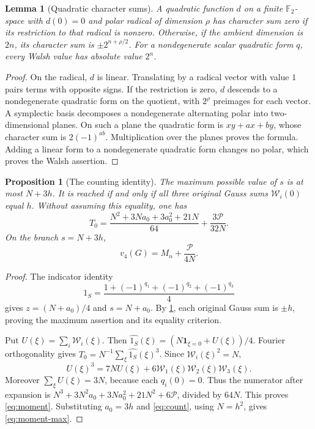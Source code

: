 \documentclass[11pt,a4paper]{article}
\newtheorem{proposition}[theorem]{Proposition}
\newtheorem{lemma}[theorem]{Lemma}
\theoremstyle{definition}
\theoremstyle{remark}
\numberwithin{equation}{section}
\newcommand{\F}{\mathbb F}
\newcommand{\Walsh}{\mathcal W}
\newcommand{\Pm}{\mathcal P}
\newcommand{\vfour}{v_4}
\begin{document}
\begin{lemma}[Quadratic character sums]\label{lem:gauss}
A quadratic function \(d\) on a finite \(\F_2\)-space with \(d(0)=0\)
and polar radical of dimension \(\rho\) has character sum zero if its
restriction to that radical is nonzero. Otherwise, if the ambient
dimension is \(2n\), its character sum is
\(\pm2^{n+\rho/2}\).
For a nondegenerate scalar quadratic form \(q\), every Walsh value has
absolute value \(2^n\).
\end{lemma}
\begin{proof}
On the radical, \(d\) is linear. Translating by a radical vector with
value \(1\) pairs terms with opposite signs. If the restriction is zero,
\(d\) descends to a nondegenerate quadratic form on the quotient, with
\(2^\rho\) preimages for each vector.
A symplectic basis decomposes a nondegenerate alternating polar into
two-dimensional planes. On such a plane the quadratic form is
\(xy+ax+by\), whose character sum is \(2(-1)^{ab}\).
Multiplication over the planes proves the formula.
Adding a linear form to a nondegenerate quadratic form changes no
polar, which proves the Walsh assertion.
\end{proof}

\begin{proposition}[The counting identity]\label{prop:moment}
The maximum possible value of \(s\) is at most \(N+3h\).
It is reached if and only if all three original Gauss sums
\(\Walsh_i(0)\) equal \(h\).
Without assuming this equality, one has
\begin{equation}\label{eq:moment}
 T_0=\frac{N^2+3Na_0+3a_0^2+21N}{64}
          +\frac{3\Pm}{32N}.
\end{equation}
On the branch \(s=N+3h\),
\begin{equation}\label{eq:moment-max}
 \vfour(G)=M_n+\frac{\Pm}{4N}.
\end{equation}
\end{proposition}
\begin{proof}
The indicator identity
\[
 1_S=\frac{1+(-1)^{q_1}+(-1)^{q_2}+(-1)^{q_3}}4
\]
gives \(z=(N+a_0)/4\) and \(s=N+a_0\).
By \cref{lem:gauss}, each original Gauss sum is \(\pm h\), proving the
maximum assertion and its equality criterion.

Put \(U(\xi)=\sum_i\Walsh_i(\xi)\). Then
\(\widehat{1_S}(\xi)=(N\mathbf1_{\xi=0}+U(\xi))/4\).
Fourier orthogonality gives \(T_0=N^{-1}\sum_\xi\widehat{1_S}(\xi)^3\).
Since \(\Walsh_i(\xi)^2=N\),
\[
 U(\xi)^3=7NU(\xi)+6\Walsh_1(\xi)\Walsh_2(\xi)\Walsh_3(\xi).
\]
Moreover \(\sum_\xi U(\xi)=3N\), because each \(q_i(0)=0\).
Thus the numerator after expansion is
\(N^3+3N^2a_0+3Na_0^2+21N^2+6\Pm\), divided by \(64N\).
This proves \eqref{eq:moment}. Substituting \(a_0=3h\) and
\eqref{eq:count}, using \(N=h^2\), gives \eqref{eq:moment-max}.
\end{proof}
\end{document}
